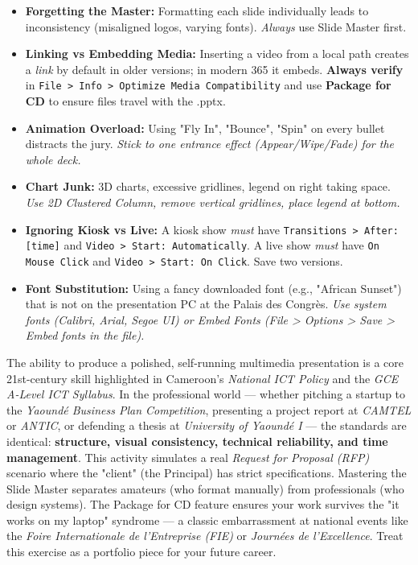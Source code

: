 \documentclass[11pt]{article}
\newcommand{\cle}[1]{{\popxbold\color{popdark}#1}}
\begin{document}
\begin{attention}
\begin{itemize}
\item \textbf{Forgetting the Master:} Formatting each slide individually leads to inconsistency (misaligned logos, varying fonts). \emph{Always} use Slide Master first.
\item \textbf{Linking vs Embedding Media:} Inserting a video from a local path creates a \emph{link} by default in older versions; in modern 365 it embeds. \textbf{Always verify} in \texttt{File > Info > Optimize Media Compatibility} and use \textbf{Package for CD} to ensure files travel with the .pptx.
\item \textbf{Animation Overload:} Using "Fly In", "Bounce", "Spin" on every bullet distracts the jury. \emph{Stick to one entrance effect (Appear/Wipe/Fade) for the whole deck.}
\item \textbf{Chart Junk:} 3D charts, excessive gridlines, legend on right taking space. \emph{Use 2D Clustered Column, remove vertical gridlines, place legend at bottom.}
\item \textbf{Ignoring Kiosk vs Live:} A kiosk show \emph{must} have \texttt{Transitions > After: [time]} and \texttt{Video > Start: Automatically}. A live show \emph{must} have \texttt{On Mouse Click} and \texttt{Video > Start: On Click}. Save two versions.
\item \textbf{Font Substitution:} Using a fancy downloaded font (e.g., "African Sunset") that is not on the presentation PC at the Palais des Congrès. \emph{Use system fonts (Calibri, Arial, Segoe UI) or Embed Fonts (File > Options > Save > Embed fonts in the file).}
\end{itemize}
\end{attention}

\begin{savaistu}
The ability to produce a polished, self-running multimedia presentation is a core \cle{21st-century skill} highlighted in Cameroon's \emph{National ICT Policy} and the \emph{GCE A-Level ICT Syllabus}. In the professional world — whether pitching a startup to the \emph{Yaoundé Business Plan Competition}, presenting a project report at \emph{CAMTEL} or \emph{ANTIC}, or defending a thesis at \emph{University of Yaoundé I} — the standards are identical: \textbf{structure, visual consistency, technical reliability, and time management}. This activity simulates a real \emph{Request for Proposal (RFP)} scenario where the "client" (the Principal) has strict specifications. Mastering the \cle{Slide Master} separates amateurs (who format manually) from professionals (who design systems). The \cle{Package for CD} feature ensures your work survives the "it works on my laptop" syndrome — a classic embarrassment at national events like the \emph{Foire Internationale de l'Entreprise (FIE)} or \emph{Journées de l'Excellence}. Treat this exercise as a portfolio piece for your future career.
\end{savaistu}
\end{document}
